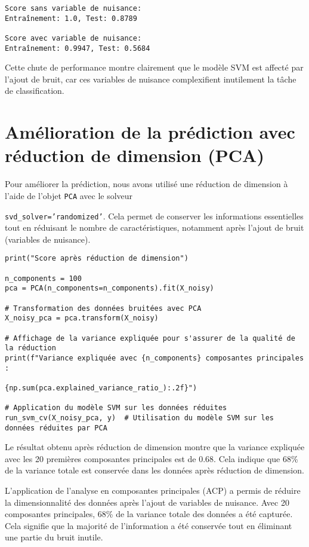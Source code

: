 \documentclass{article}
\begin{document}
\begin{itemize}
\begin{verbatim}
Score sans variable de nuisance:
Entraînement: 1.0, Test: 0.8789

Score avec variable de nuisance:
Entraînement: 0.9947, Test: 0.5684
\end{verbatim}

Cette chute de performance montre clairement que le modèle SVM est 
affecté par l'ajout de bruit, car ces variables de nuisance complexifient 
inutilement la tâche de classification.

\section{Amélioration de la prédiction avec réduction de dimension (PCA)}

Pour améliorer la prédiction, nous avons utilisé une réduction de
dimension à l'aide de l'objet \texttt{PCA} avec le solveur 

\texttt{svd\_solver='randomized'}. Cela permet de conserver les 
informations essentielles tout en réduisant le nombre de 
caractéristiques, notamment après l'ajout de bruit (variables de
nuisance).


\begin{verbatim}
print("Score après réduction de dimension")

n_components = 100 
pca = PCA(n_components=n_components).fit(X_noisy)

# Transformation des données bruitées avec PCA
X_noisy_pca = pca.transform(X_noisy)

# Affichage de la variance expliquée pour s'assurer de la qualité de la réduction
print(f"Variance expliquée avec {n_components} composantes principales :

{np.sum(pca.explained_variance_ratio_):.2f}")

# Application du modèle SVM sur les données réduites
run_svm_cv(X_noisy_pca, y)  # Utilisation du modèle SVM sur les données réduites par PCA
\end{verbatim}

Le résultat obtenu après réduction de dimension montre que la variance 
expliquée avec les 20 premières composantes principales est de 0.68. Cela 
indique que 68\% de la variance totale est conservée dans les données 
après réduction de dimension.

L'application de l'analyse en composantes principales (ACP) a permis de 
réduire la dimensionnalité des données après l'ajout de variables de 
nuisance. Avec 20 composantes principales, 68\%  de la variance totale 
des données a été capturée. Cela signifie que la majorité de 
l'information a été conservée tout en éliminant une partie du bruit 
inutile.



\end{itemize}
\end{document}
